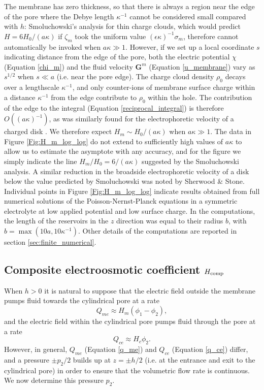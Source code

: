 The membrane has zero thickness, so that there is always a region near
the edge of the pore where the Debye length $\kappa^{-1}$ cannot be
considered small compared with $h$:
Smoluchowski's analysis for thin charge
clouds, which would predict $H=6H_0/(a\kappa)$ if $\zeta_m$ took the
uniform value $(\epsilon\kappa)^{-1}\sigma_m$,
therefore cannot automatically be invoked when $a\kappa\gg 1$.
However, if we set up a local coordinate $s$ indicating distance from
the edge of the pore, both the electric potential $\chi$ (Equation \ref{chi_m})
and the fluid velocity $\mathbf{G}^m$ (Equation \ref{u_membrane})
vary as $s^{1/2}$ when $s\ll a$ (i.e. near the pore edge).
The charge cloud density $\rho_0$ decays over a lengthscale $\kappa^{-1}$,
and only counter-ions of membrane surface charge within a distance $\kappa^{-1}$
from the edge contribute to $\rho_0$ within the hole. The contribution
of the edge to the integral (Equation \ref{reciprocal_integral})
is therefore $O((a\kappa)^{-1})$,
as was similarly found for the electrophoretic velocity of a charged disk \cite{Sherwood1995}.
We therefore expect
$H_m\sim H_0/(a\kappa)$ when $a\kappa\gg 1$. The data in
Figure \ref{Fig:H_m_log_log} do not extend to sufficiently high
values of $a\kappa$ to allow us to estimate the asymptote with
any accuracy, and for the figure we simply indicate the line
$H_m/H_0=6/(a\kappa)$ suggested by the Smoluchowski analysis.
A similar reduction in the broadside electrophoretic velocity of a disk
below the value predicted by Smoluchowski was
noted by Sherwood \& Stone.\cite{Sherwood1995}
Individual points in Figure \ref{Fig:H_m_log_log}
indicate results obtained from full numerical solutions of
the Poisson-Nernst-Planck equations in a symmetric electrolyte
at low applied potential and low surface charge. 
In the computations, the length of
the reservoirs in the $z$ direction was equal to their
radius $b$, with $b=\max(10a,10\kappa^{-1})$.
Other details of the computations are reported in section \ref{sec:finite_numerical}.

\subsection{Composite electroosmotic coefficient $H_{\rm comp}$}
\label{subsec:finite_composite2}
When $h>0$ it is natural to suppose that the electric field
outside
the membrane pumps fluid towards the cylindrical pore at a rate
\begin{equation}
Q_{me}\approx H_m(\phi_1-\phi_2),
\label{q_me}
\end{equation}
and the electric field within the cylindrical pore
pumps fluid through the pore at a rate
\begin{equation}
Q_{ce}\approx H_c\phi_2.
\label{q_ce}
\end{equation}
However, in general, $Q_{me}$ (Equation \ref{q_me}) and
$Q_{ce}$ (Equation \ref{q_ce}) differ, and a pressure $\pm p_2/2$ builds
up at $z=\pm h/2$ (i.e. at the entrance and exit to the cylindrical pore)
in order to ensure that the volumetric flow rate is
continuous. We now determine this pressure $p_2$.

